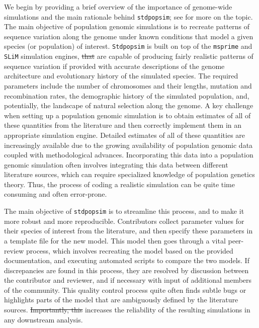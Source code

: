\documentclass[hidelinks]{article}
\newcommand{\Stdpopsim}{\texttt{Stdpopsim}\xspace}
\newcommand{\stdpopsim}{\texttt{stdpopsim}\xspace}
\providecommand{\DIFaddtex}[1]{{\protect\color{blue}\uwave{#1}}} %
\providecommand{\DIFdeltex}[1]{{\protect\color{red}\sout{#1}}}                      %
\providecommand{\DIFaddbegin}{} %
\providecommand{\DIFaddend}{} %
\providecommand{\DIFdelbegin}{} %
\providecommand{\DIFdelend}{} %
\providecommand{\DIFadd}[1]{\texorpdfstring{\DIFaddtex{#1}}{#1}} %
\providecommand{\DIFdel}[1]{\texorpdfstring{\DIFdeltex{#1}}{}} %
\newcommand{\DIFscaledelfig}{0.5}
\newlength{\DIFdelgraphicswidth} %
\newlength{\DIFdelgraphicsheight} %
\newcommand{\DIFaddincludegraphics}[2][]{{\color{blue}\fbox{\DIFOincludegraphics[#1]{#2}}}} %
\newcommand{\DIFdelincludegraphics}[2][]{%
\sbox{\DIFdelgraphicsbox}{\DIFOincludegraphics[#1]{#2}}%
\settoboxwidth{\DIFdelgraphicswidth}{\DIFdelgraphicsbox} %
\settoboxtotalheight{\DIFdelgraphicsheight}{\DIFdelgraphicsbox} %
\scalebox{\DIFscaledelfig}{%
\parbox[b]{\DIFdelgraphicswidth}{\usebox{\DIFdelgraphicsbox}\\[-\baselineskip] \rule{\DIFdelgraphicswidth}{0em}}\llap{\resizebox{\DIFdelgraphicswidth}{\DIFdelgraphicsheight}{%
\setlength{\unitlength}{\DIFdelgraphicswidth}%
\begin{picture}(1,1)%
\thicklines\linethickness{2pt} %
{\color[rgb]{1,0,0}\put(0,0){\framebox(1,1){}}}%
{\color[rgb]{1,0,0}\put(0,0){\line( 1,1){1}}}%
{\color[rgb]{1,0,0}\put(0,1){\line(1,-1){1}}}%
\end{picture}%
}\hspace*{3pt}}} %
} %
\DeclareRobustCommand{\DIFaddbegin}{\DIFOaddbegin \let\includegraphics\DIFaddincludegraphics} %
\DeclareRobustCommand{\DIFaddend}{\DIFOaddend \let\includegraphics\DIFOincludegraphics} %
\DeclareRobustCommand{\DIFdelbegin}{\DIFOdelbegin \let\includegraphics\DIFdelincludegraphics} %
\DeclareRobustCommand{\DIFdelend}{\DIFOaddend \let\includegraphics\DIFOincludegraphics} %
\begin{document}
We begin by providing a brief overview of the importance of genome-wide simulations and the main rationale behind \stdpopsim;
see \citet{Adrion2020} for more on the topic.
The main objective of population genomic simulations is to recreate 
patterns of sequence variation along the genome under known conditions
that model a given species (or population) of interest.
\Stdpopsim is built on top of the
\texttt{msprime} \citep{Kelleher2016,Nelson2020,Baumdicker2022}
and \texttt{SLiM} \citep{Haller2019} simulation engines,
\DIFdelbegin \DIFdel{that }\DIFdelend \DIFaddbegin \DIFadd{which }\DIFaddend are capable of producing fairly realistic patterns of sequence variation
if provided with accurate descriptions of the genome architecture
and evolutionary history of the simulated species.
The required parameters include the number of chromosomes and their lengths,
mutation and recombination rates, the demographic history of the simulated population,
and, potentially, the landscape of natural selection along the genome.
A key challenge when setting up a population genomic simulation is to
obtain estimates of all of these quantities from the literature
and then correctly implement them in an appropriate simulation engine.
Detailed estimates of all of these quantities are increasingly available
due to the growing availability of population genomic data
coupled with methodological advances. Incorporating this data
into a population genomic simulation often involves 
integrating this data between different literature sources, which can
require specialized knowledge of population genetics theory.
Thus, the process of coding a realistic simulation can be quite time consuming and often error-prone.


The main objective of \stdpopsim is to streamline this process,
and to make it more robust and more reproducible.
Contributors collect parameter values for their species of interest from the literature,
and then specify these parameters in a template file for the new model.
This model then goes through a vital peer-review process,
which involves recreating the model based on the provided documentation,
and executing automated scripts to compare the two models.
If discrepancies are found in this process, they are resolved by discussion between the contributor and reviewer,
and if necessary with input of additional members of the community.
This quality control process quite often finds subtle bugs \citep[e.g., as in][]{Ragsdale2020}
or highlights parts of the model that are ambiguously defined by the literature sources.
\DIFdelbegin \DIFdel{Importantly, this }\DIFdelend \DIFaddbegin \DIFadd{This }\DIFaddend increases the reliability of the resulting simulations in any downstream analysis.
\end{document}
